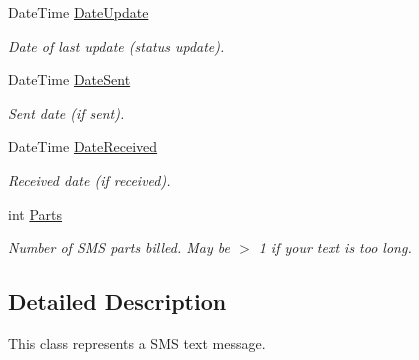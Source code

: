 \begin{DoxyCompactItemize}
Date\+Time \hyperlink{class_thecallr_api_1_1_objects_1_1_sms_1_1_sms_afe96e975ed1571dd2f5de10febd5a4ea}{Date\+Update}
\begin{DoxyCompactList}\small\item\em Date of last update (status update). \end{DoxyCompactList}\item 
Date\+Time \hyperlink{class_thecallr_api_1_1_objects_1_1_sms_1_1_sms_aa042a2a85dec93e3f22c5c36534d1dfe}{Date\+Sent}
\begin{DoxyCompactList}\small\item\em Sent date (if sent). \end{DoxyCompactList}\item 
Date\+Time \hyperlink{class_thecallr_api_1_1_objects_1_1_sms_1_1_sms_aa6845032ebb03aaa18b69d7fc5e87367}{Date\+Received}
\begin{DoxyCompactList}\small\item\em Received date (if received). \end{DoxyCompactList}\item 
int \hyperlink{class_thecallr_api_1_1_objects_1_1_sms_1_1_sms_a6910e0004b98ac99d14f70217fc10c3e}{Parts}
\begin{DoxyCompactList}\small\item\em Number of S\+M\+S parts billed. May be $>$ 1 if your text is too long. \end{DoxyCompactList}\end{DoxyCompactItemize}


\subsection{Detailed Description}
This class represents a S\+M\+S text message. 



